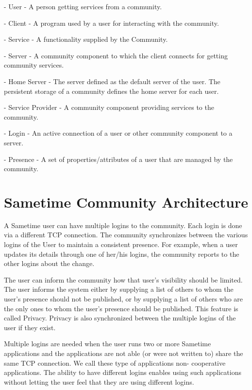 \documentclass[titlepage,oneside]{book}
\begin{document}
\par{} - User - A person getting services from a community.

\par{} - Client - A program used by a user for interacting with the
community.

\par{} - Service - A functionality supplied by the Community.

\par{} - Server - A community component to which the client connects
for getting community services.

\par{} - Home Server - The server defined as the default server of the
user.  The persistent storage of a community defines the home server
for each user.

\par{} - Service Provider - A community component providing services
to the community.

\par{} - Login - An active connection of a user or other community
component to a server.

\par{} - Presence - A set of properties/attributes of a user that are
managed by the community.

\section{Sametime Community Architecture}

\par{} A Sametime user can have multiple logins to the community. Each
login is done via a different TCP connection. The community
synchronizes between the various logins of the User to maintain a
consistent presence. For example, when a user updates its details
through one of her/his logins, the community reports to the other
logins about the change.

\par{} The user can inform the community how that user's visibility
should be limited. The user informs the system either by supplying a
list of others to whom the user's presence should not be published, or
by supplying a list of others who are the only ones to whom the user's
presence should be published. This feature is called Privacy. Privacy
is also synchronized between the multiple logins of the user if they
exist.

\par{} Multiple logins are needed when the user runs two or more
Sametime applications and the applications are not able (or were not
written to) share the same TCP connection. We call these type of
applications non- cooperative applications. The ability to have
different logins enables using such applications without letting the
user feel that they are using different logins.
\end{document}
